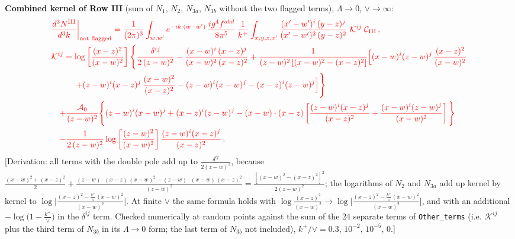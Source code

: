 \documentclass[9pt]{article}
\numberwithin{equation}{section}
\begin{document}
\noindent\textbf{Combined kernel of Row III} (sum of $N_{1}$, $N_{2}$, $N_{3a}$, $N_{3b}$ without the two flagged terms), $\Lambda\to0$, $\vee\to\infty$:
\begin{align}
&{\color{red}\frac{d^{3}N^{\rm III}}{d^{3}k}\bigg|_{\text{not flagged}}=\frac{1}{(2\pi)^{3}}\int_{w,w'}e^{-ik\cdot(w-w')}\,\frac{ig^{4}f^{abd}}{8\pi^{5}}\,\frac{1}{k^{+}}\int_{x,y,z,x'}\frac{(x'-w')^{i}\,(y-z)^{j}}{(x'-w')^{2}\,(y-z)^{2}}\;\mathcal{K}^{ij}\;\mathcal{C}_{\rm III}\,,}\notag\\
&{\color{red}\mathcal{K}^{ij}=\log\left[\frac{(x-z)^{2}}{(x-w)^{2}}\right]\Bigg\{\frac{\delta^{ij}}{2\,(z-w)^{2}}-\frac{(x-w)^{i}\,(x-z)^{j}}{(x-w)^{2}\,(x-z)^{2}}
+\frac{1}{(z-w)^{2}\left[(x-w)^{2}-(x-z)^{2}\right]}\Big[(x-w)^{i}(z-w)^{j}\,\frac{(x-z)^{2}}{(x-w)^{2}}}\notag\\
&{\color{red}\qquad\quad+(z-w)^{i}(x-z)^{j}\,\frac{(x-w)^{2}}{(x-z)^{2}}-(z-w)^{i}(x-w)^{j}-(x-z)^{i}(z-w)^{j}\Big]\Bigg\}}\notag\\
&{\color{red}\quad+\frac{\mathcal{A}_{0}}{(z-w)^{2}}\Bigg\{(z-w)^{i}(x-w)^{j}+(x-z)^{i}(z-w)^{j}-(x-w)\cdot(x-z)\left[\frac{(z-w)^{i}(x-z)^{j}}{(x-z)^{2}}+\frac{(x-w)^{i}(z-w)^{j}}{(x-w)^{2}}\right]\Bigg\}}\notag\\
&{\color{red}\quad-\frac{1}{2\,(z-w)^{2}}\log\left[\frac{(z-w)^{2}}{(x-w)^{2}}\right]\frac{(z-w)^{i}(x-z)^{j}}{(x-z)^{2}}\,.}
\end{align}
{\color{red}[Derivation: all terms with the double pole add up to $\frac{\delta^{ij}}{2(z-w)^{2}}$, because $\frac{(x-w)^{2}+(x-z)^{2}}{2}+\frac{(z-w)\cdot(x-z)\,(x-w)^{2}-(z-w)\cdot(x-w)\,(x-z)^{2}}{(z-w)^{2}}=\frac{[(x-w)^{2}-(x-z)^{2}]^{2}}{2(z-w)^{2}}$; the logarithms of $N_{2}$ and $N_{3a}$ add up kernel by kernel to $\log\big|\frac{(x-z)^{2}-\frac{k^{+}}{\vee}(x-w)^{2}}{(x-w)^{2}}\big|$. At finite $\vee$ the same formula holds with $\log\frac{(x-z)^{2}}{(x-w)^{2}}\to\log\big|\frac{(x-z)^{2}-\frac{k^{+}}{\vee}(x-w)^{2}}{(x-w)^{2}}\big|$, and with an additional $-\log\big(1-\frac{k^{+}}{\vee}\big)$ in the $\delta^{ij}$ term. Checked numerically at random points against the sum of the 24 separate terms of \texttt{Other\_terms} (i.e. $\mathcal{K}^{ij}$ plus the third term of $N_{3b}$ in its $\Lambda\to0$ form; the last term of $N_{3b}$ not included), $k^{+}/\vee=0.3,\,10^{-2},\,10^{-5},\,0$.]}
\end{document}
